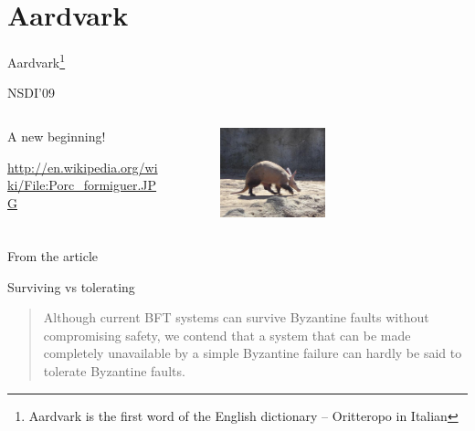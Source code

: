\section{Aardvark}

\begin{frame}{Aardvark\footnote{Aardvark is the first word of the English dictionary -- Oritteropo in Italian}}
	
\begin{block}{NSDI'09}
{\small
{}
}
\end{block}	
	
\begin{columns}
\begin{column}{0.4\textwidth}
\BIL
\item A new beginning!
\item {\tiny \url{http://en.wikipedia.org/wiki/File:Porc_formiguer.JPG}}

\EIL
\end{column}
\begin{column}{0.6\textwidth}
\begin{figure}
	\includegraphics[width=0.5\textwidth]{aardvark.png}\\
\end{figure}
\end{column}
\end{columns}


\end{frame}

\begin{frame}{From the article}

\begin{block}{Surviving vs tolerating}
\begin{quote}
Although current BFT systems can survive Byzantine faults without
compromising safety, we contend that a system that can be made completely
unavailable by a simple Byzantine failure can hardly be said to tolerate
Byzantine faults.
\end{quote}
\end{block}

\end{frame}

